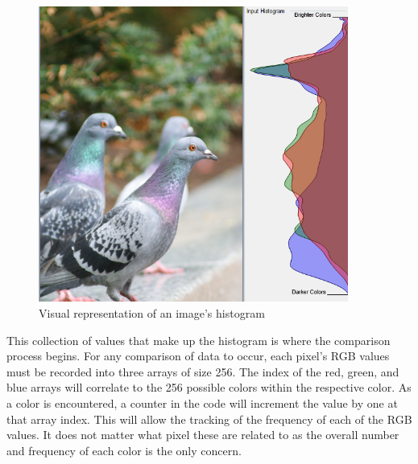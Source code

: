 \begin{figure}[htbp]
\centering
\includegraphics[width=4in]{historep}
\caption{Visual representation of an image's histogram}
\label{historep}
\end{figure}

This collection of values that make up the histogram is where the comparison process begins. For any comparison of data to occur, each pixel's RGB values must be recorded into three arrays of size 256. The index of the red, green, and blue arrays will correlate to the 256 possible colors within the respective color. As a color is encountered, a counter in the code will increment the value by one at that array index. This will allow the tracking of the frequency of each of the RGB values. It does not matter what pixel these are related to as the overall number and frequency of each color is the only concern.

